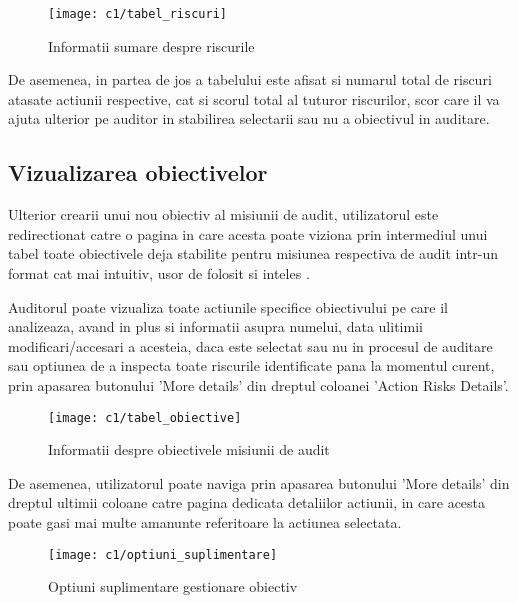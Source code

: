 \vspace{1cm}
\begin{figure}[h]
	\centering
	
	\texttt{[image: c1/tabel\_riscuri]}
	\caption{Informatii sumare despre riscurile}
\end{figure}

De asemenea, in partea de jos a tabelului este afisat si numarul total de riscuri atasate actiunii respective, cat si scorul total al tuturor riscurilor, scor care il va ajuta ulterior pe auditor in stabilirea selectarii sau nu a obiectivul in auditare.

\subsection{Vizualizarea obiectivelor}

Ulterior crearii unui nou obiectiv al misiunii de audit, utilizatorul este redirectionat catre o pagina in care acesta poate viziona prin intermediul unui tabel toate obiectivele deja stabilite pentru misiunea respectiva de audit intr-un format cat mai intuitiv, usor de folosit si inteles .

Auditorul poate vizualiza toate actiunile specifice obiectivului pe care il analizeaza, avand in plus si informatii asupra numelui, data ulitimii modificari/accesari a acesteia, daca este selectat sau nu in procesul de auditare sau optiunea de a inspecta toate riscurile identificate pana la momentul curent, prin apasarea butonului 'More details' din dreptul coloanei 'Action Risks Details'.

\vspace{1cm}
\begin{figure}[h]
	\centering
	
	\texttt{[image: c1/tabel\_obiective]}
	\caption{Informatii despre obiectivele misiunii de audit}
\end{figure}



De asemenea, utilizatorul poate naviga prin apasarea butonului 'More details' din dreptul ultimii coloane catre pagina dedicata detaliilor actiunii, in care acesta poate gasi mai multe amanunte referitoare la actiunea selectata.


\vspace{1cm}
\begin{figure}[h]
	\centering
	
	\texttt{[image: c1/optiuni\_suplimentare]}
	\caption{Optiuni suplimentare gestionare obiectiv}
\end{figure}


